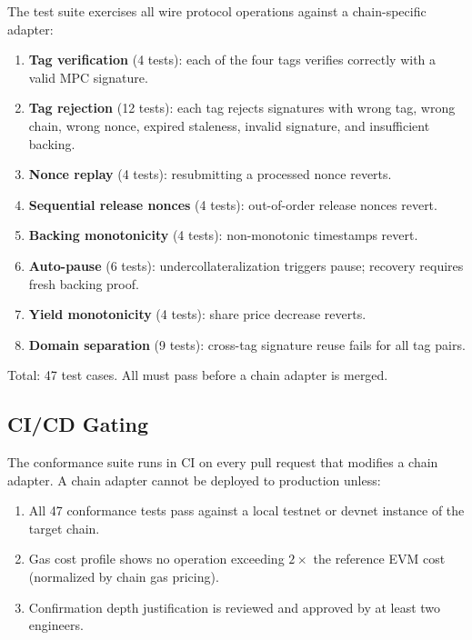 The test suite exercises all wire protocol operations against a chain-specific adapter:

\begin{enumerate}[nosep]
  \item \textbf{Tag verification} (4 tests): each of the four tags verifies correctly with a valid MPC signature.
  \item \textbf{Tag rejection} (12 tests): each tag rejects signatures with wrong tag, wrong chain, wrong nonce, expired staleness, invalid signature, and insufficient backing.
  \item \textbf{Nonce replay} (4 tests): resubmitting a processed nonce reverts.
  \item \textbf{Sequential release nonces} (4 tests): out-of-order release nonces revert.
  \item \textbf{Backing monotonicity} (4 tests): non-monotonic timestamps revert.
  \item \textbf{Auto-pause} (6 tests): undercollateralization triggers pause; recovery requires fresh backing proof.
  \item \textbf{Yield monotonicity} (4 tests): share price decrease reverts.
  \item \textbf{Domain separation} (9 tests): cross-tag signature reuse fails for all tag pairs.
\end{enumerate}

Total: 47 test cases. All must pass before a chain adapter is merged.

\subsection{CI/CD Gating}

The conformance suite runs in CI on every pull request that modifies a chain adapter. A chain adapter cannot be deployed to production unless:

\begin{enumerate}[nosep]
  \item All 47 conformance tests pass against a local testnet or devnet instance of the target chain.
  \item Gas cost profile shows no operation exceeding $2\times$ the reference EVM cost (normalized by chain gas pricing).
  \item Confirmation depth justification is reviewed and approved by at least two engineers.
\end{enumerate}

